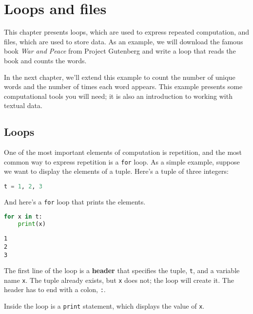 \hypertarget{loops-and-files}{%
\chapter{Loops and files}\label{loops-and-files}}

This chapter presents loops, which are used to express repeated
computation, and files, which are used to store data. As an example, we
will download the famous book \emph{War and Peace} from Project
Gutenberg and write a loop that reads the book and counts the words.

In the next chapter, we'll extend this example to count the number of
unique words and the number of times each word appears. This example
presents some computational tools you will need; it is also an
introduction to working with textual data.

\hypertarget{loops}{%
\section{Loops}\label{loops}}

One of the most important elements of computation is repetition, and the
most common way to express repetition is a \passthrough{\lstinline!for!}
loop. As a simple example, suppose we want to display the elements of a
tuple. Here's a tuple of three integers:

\begin{lstlisting}[language=Python,style=source]
t = 1, 2, 3
\end{lstlisting}

And here's a \passthrough{\lstinline!for!} loop that prints the
elements.

\begin{lstlisting}[language=Python,style=source]
for x in t:
    print(x)
\end{lstlisting}

\begin{lstlisting}[style=output]
1
2
3
\end{lstlisting}

The first line of the loop is a \textbf{header} that specifies the
tuple, \passthrough{\lstinline!t!}, and a variable name
\passthrough{\lstinline!x!}. The tuple already exists, but
\passthrough{\lstinline!x!} does not; the loop will create it. The
header has to end with a colon, \passthrough{\lstinline!:!}.

Inside the loop is a \passthrough{\lstinline!print!} statement, which
displays the value of \passthrough{\lstinline!x!}.

